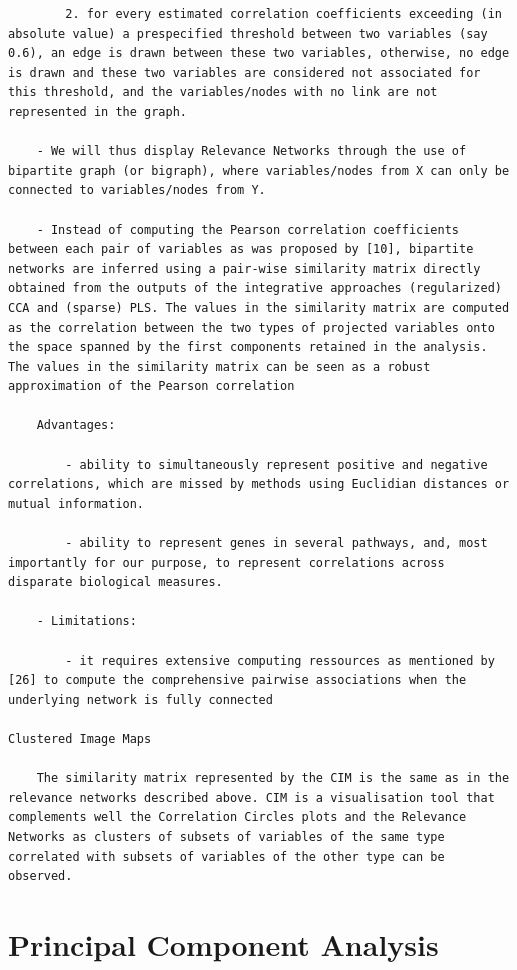 \documentclass[
]{book}
\begin{document}
\begin{verbatim}
        2. for every estimated correlation coefficients exceeding (in absolute value) a prespecified threshold between two variables (say 0.6), an edge is drawn between these two variables, otherwise, no edge is drawn and these two variables are considered not associated for this threshold, and the variables/nodes with no link are not represented in the graph.

    - We will thus display Relevance Networks through the use of bipartite graph (or bigraph), where variables/nodes from X can only be connected to variables/nodes from Y.

    - Instead of computing the Pearson correlation coefficients between each pair of variables as was proposed by [10], bipartite networks are inferred using a pair-wise similarity matrix directly obtained from the outputs of the integrative approaches (regularized) CCA and (sparse) PLS. The values in the similarity matrix are computed as the correlation between the two types of projected variables onto the space spanned by the first components retained in the analysis. The values in the similarity matrix can be seen as a robust approximation of the Pearson correlation

    Advantages:

        - ability to simultaneously represent positive and negative correlations, which are missed by methods using Euclidian distances or mutual information.

        - ability to represent genes in several pathways, and, most importantly for our purpose, to represent correlations across disparate biological measures.

    - Limitations:

        - it requires extensive computing ressources as mentioned by [26] to compute the comprehensive pairwise associations when the underlying network is fully connected

Clustered Image Maps

    The similarity matrix represented by the CIM is the same as in the relevance networks described above. CIM is a visualisation tool that complements well the Correlation Circles plots and the Relevance Networks as clusters of subsets of variables of the same type correlated with subsets of variables of the other type can be observed.
\end{verbatim}

\hypertarget{principal-component-analysis}{%
\section{Principal Component Analysis}\label{principal-component-analysis}}
\end{document}
